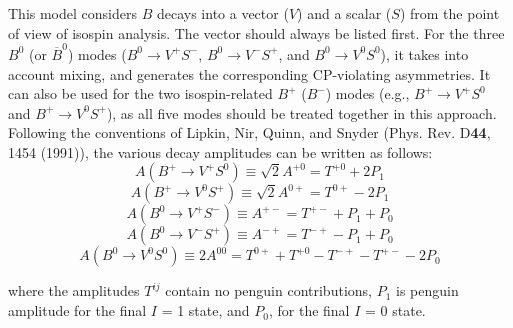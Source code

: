 \Expl
This model considers $B$ decays into a vector ($V$) and a scalar ($S$) 
from the point of view of isospin analysis.  The vector should always 
be listed first.  For the three $B^{0}$ (or $\overline{B}^{0}$) 
modes ($B^{0} \rightarrow V^{+} S^{-}$, $B^{0} \rightarrow V^{-} 
S^{+}$, and $B^{0} \rightarrow V^{0} S^{0}$),
it takes into account mixing, and generates the corresponding 
CP-violating asymmetries.  It can also be used for the two 
isospin-related $B^{+}$ 
($B^{-}$) modes (e.g., $B^{+} \rightarrow V^{+} S^{0}$ and $B^{+} 
\rightarrow V^{0} S^{+}$), as all five modes should 
be treated together in this approach.  
Following the conventions of Lipkin, Nir, Quinn, and Snyder 
(Phys. Rev. D{\bf 44}, 1454 (1991)), the various decay 
amplitudes can be written as follows:
\begin{equation}
A(B^{+} \rightarrow V^{+} S^{0}) \equiv \sqrt{2}A^{+0} = T^{+0} + 2 P_{1} 
\end{equation}
\begin{equation}
A(B^{+} \rightarrow V^{0} S^{+}) \equiv \sqrt{2}A^{0+} = T^{0+} - 2 P_{1} 
\end{equation}
\begin{equation}
A(B^{0} \rightarrow V^{+} S^{-}) \equiv A^{+-} = T^{+-} + P_{1} + P_{0} 
\end{equation}
\begin{equation}
A(B^{0} \rightarrow V^{-} S^{+}) \equiv A^{-+} = T^{-+} - P_{1} + P_{0} 
\end{equation}
\begin{equation}
A(B^{0} \rightarrow V^{0} S^{0}) \equiv 2 A^{00} = T^{0+} + T^{+0} - T^{-+} - T^{+-} - 2 P_{0} 
\end{equation}

where the amplitudes $T^{ij}$ contain no penguin contributions, $P_{1}$ is penguin amplitude for the final $I$ = 1 state, and $P_{0}$, for the final $I$ = 0 state.  

